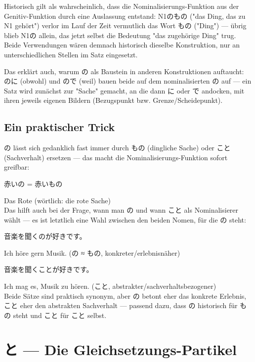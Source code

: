 \documentclass[12pt]{book}
\begin{document}
Historisch gilt als wahrscheinlich, dass die Nominalisierungs-Funktion aus der Genitiv-Funktion durch eine Auslassung entstand: N1のもの ("das Ding, das zu N1 gehört") verlor im Lauf der Zeit vermutlich das Wort もの ("Ding") — übrig blieb N1の allein, das jetzt selbst die Bedeutung "das zugehörige Ding" trug. Beide Verwendungen wären demnach historisch dieselbe Konstruktion, nur an unterschiedlichen Stellen im Satz eingesetzt.

Das erklärt auch, warum の als Baustein in anderen Konstruktionen auftaucht: のに (obwohl) und ので (weil) bauen beide auf dem nominalisierten の auf — ein Satz wird zunächst zur "Sache" gemacht, an die dann に oder で andocken, mit ihren jeweils eigenen Bildern (Bezugspunkt bzw. Grenze/Scheidepunkt).

\section*{Ein praktischer Trick}

の lässt sich gedanklich fast immer durch もの (dingliche Sache) oder こと (Sachverhalt) ersetzen — das macht die Nominalisierungs-Funktion sofort greifbar:

\par\quad 赤いの = 赤いもの\\
\par\quad Das Rote (wörtlich: die rote Sache)\\

Das hilft auch bei der Frage, wann man の und wann こと als Nominalisierer wählt — es ist letztlich eine Wahl zwischen den beiden Nomen, für die の steht:

\par\quad 音楽を聞くのが好きです。\\
\par\quad Ich höre gern Musik. (の ≈ もの, konkreter/erlebnisnäher)\\

\par\quad 音楽を聞くことが好きです。\\
\par\quad Ich mag es, Musik zu hören. (こと, abstrakter/sachverhaltsbezogener)\\

Beide Sätze sind praktisch synonym, aber の betont eher das konkrete Erlebnis, こと eher den abstrakten Sachverhalt — passend dazu, dass の historisch für もの steht und こと für こと selbst.


\chapter{と — Die Gleichsetzungs-Partikel}
\end{document}
